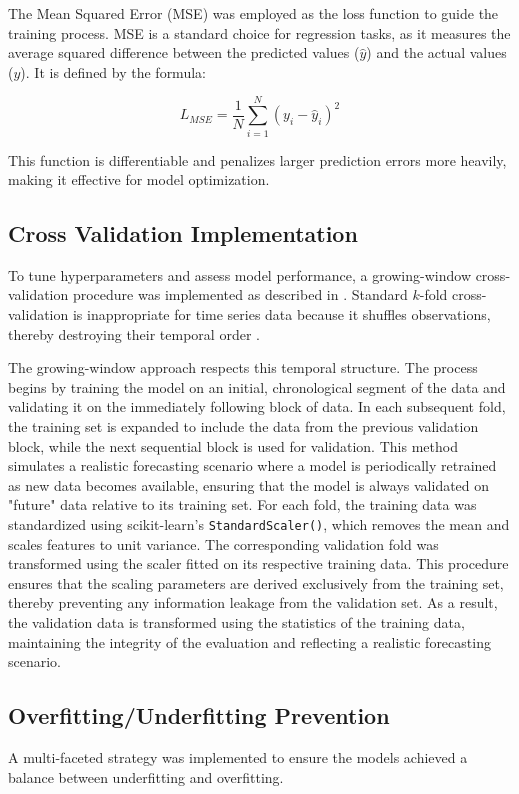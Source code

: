 \documentclass[conference, 10pt]{IEEEtran}
\begin{document}
The Mean Squared Error (MSE) was employed as the loss function to guide the training process. MSE is a standard choice
for regression tasks, as it measures the average squared difference between the predicted values ($\hat{y}$) and the actual
values ($y$). It is defined by the formula:

$$L_{MSE} = \frac{1}{N} \sum_{i=1}^{N} (y_i - \hat{y}_i)^2$$ 

This function is differentiable and penalizes larger prediction errors more heavily, making it effective for model
optimization.

\subsection{Cross Validation Implementation}
To tune hyperparameters and assess model performance, a growing-window cross-validation procedure was implemented as
described in \cite{CrossValidationTimeseries}. Standard $k$-fold cross-validation is inappropriate for time series data
because it shuffles observations, thereby destroying their temporal order \cite{CrossValidationTimeseries}.

The growing-window approach respects this temporal structure. The process begins by training the model on an initial,
chronological segment of the data and validating it on the immediately following block of data. In each subsequent fold,
the training set is expanded to include the data from the previous validation block, while the next sequential block is
used for validation. This method simulates a realistic forecasting scenario where a model is periodically retrained as
new data becomes available, ensuring that the model is always validated on "future" data relative to its training set.
For each fold, the training data was standardized using scikit-learn's \texttt{StandardScaler()}, which removes the mean
and scales features to unit variance. The corresponding validation fold was transformed using the scaler fitted on its
respective training data. This procedure ensures that the scaling parameters are derived exclusively from the training
set, thereby preventing any information leakage from the validation set. As a result, the validation data is transformed
using the statistics of the training data, maintaining the integrity of the evaluation and reflecting a realistic
forecasting scenario.

\subsection{Overfitting/Underfitting Prevention}
A multi-faceted strategy was implemented to ensure the models achieved a balance between underfitting and overfitting.
\end{document}
